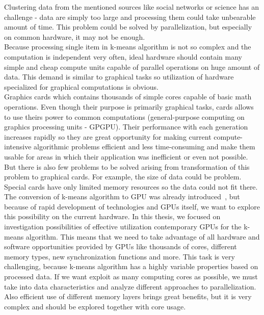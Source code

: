 Clustering data from the mentioned sources like social networks or science has an challenge - data are simply too large and processing them could take unbearable amount of time. This problem could be solved by parallelization, but especially on common hardware, it may not be enough. \\
Because processing single item in k-means algorithm is not so complex and the computation is independent very often, ideal hardware should contain many simple and cheap compute units capable of parallel operations on huge amount of data. This demand is similar to graphical tasks so utilization of hardware specialized for graphical computations is obvious.\\
Graphics cards which contains thousands of simple cores capable of basic math operations. Even though their purpose is primarily graphical tasks, cards allows to use theirs power to common computations (general-purpose computing on graphics processing units - GPGPU). Their performance with each generation increases rapidly so they are great opportunity for making current compute-intensive algorithmic problems efficient and less time-consuming and make them usable for areas in which their application was inefficient or even not possible.\\
But there is also few problems to be solved arising from transformation of this problem to graphical cards. For example, the size of data could be problem. Special cards have only limited memory resources so the data could not fit there.\\

The conversion of k-means algorithm to GPU was already introduced~\cite{Hong09}, but because of rapid development of  technologies and GPUs itself, we want to explore this possibility on the current hardware. In this thesis, we focused on investigation possibilities of effective utilization contemporary GPUs for the k-means algorithm. This means that we need to take advantage of all hardware and software opportunities provided by GPUs like thousands of cores, different memory types, new synchronization functions and more. This task is very challenging, because k-means algorithm has a highly variable properties based on processed data. If we want exploit as many computing cores as possible, we must take into data characteristics and analyze different approaches to parallelization. Also efficient use of different memory layers brings great benefits, but it is very complex and should be explored together with core usage.\\

